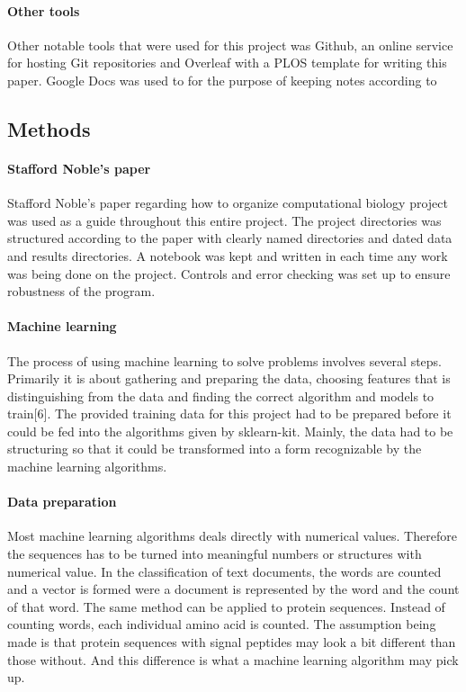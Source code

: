 \documentclass[10pt,letterpaper]{article}
\begin{document}
\paragraph{Other tools}
Other notable tools that were used for this project was Github, an online service for hosting Git repositories and Overleaf with a PLOS template for writing this paper. Google Docs was used to for the purpose of keeping notes according to 

\subsection*{Methods}
\paragraph{Stafford Noble's paper}
Stafford Noble's paper regarding how to organize computational biology project was used as a guide throughout this entire project. 
The project directories was structured according to the paper with clearly named directories and dated data and results directories. A notebook was kept and written in each time any work was being done on the project. Controls and error checking was set up to ensure robustness of the program.

\paragraph*{Machine learning}
The process of using machine learning to solve problems involves several steps. Primarily it is about gathering and preparing the data, choosing features that is distinguishing from the data and finding the correct algorithm and models to train[6]. The provided training data for this project had to be prepared before it could be fed into the algorithms given by sklearn-kit. Mainly, the data had to be structuring so that it could be transformed into a form recognizable by the machine learning algorithms. 

\paragraph*{Data preparation}
Most machine learning algorithms deals directly with numerical values. Therefore the sequences has to be turned into meaningful numbers or structures with numerical value. In the classification of text documents, the words are counted and a vector is formed were a document is represented by the word and the count of that word. The same method can be applied to protein sequences. Instead of counting words, each individual amino acid is counted. The assumption being made is that protein sequences with signal peptides may look a bit different than those without. And this difference is what a machine learning algorithm may pick up.
\end{document}
